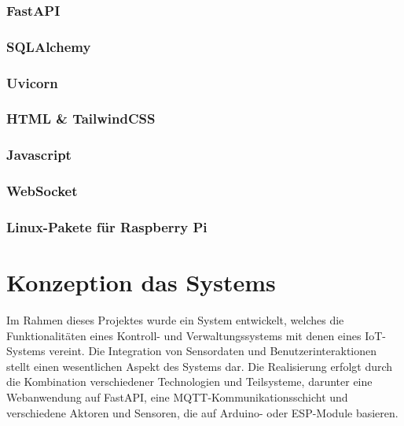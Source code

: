 \documentclass[12pt, letterpaper]{article}
\begin{document}
    \subsubsection{FastAPI}
    \subsubsection{SQLAlchemy}
    \subsubsection{Uvicorn}
    \subsubsection{HTML \& TailwindCSS}
    \subsubsection{Javascript}
    \subsubsection{WebSocket}
    \subsubsection{Linux-Pakete für Raspberry Pi}

\newpage
\section{Konzeption das Systems}
\par Im Rahmen dieses Projektes wurde ein System entwickelt, welches die Funktionalitäten eines Kontroll- und Verwaltungssystems mit denen eines IoT-Systems vereint. Die Integration von Sensordaten und Benutzerinteraktionen stellt einen wesentlichen Aspekt des Systems dar. Die Realisierung erfolgt durch die Kombination verschiedener Technologien und Teilsysteme, darunter eine Webanwendung auf FastAPI, eine MQTT-Kommunikationsschicht und verschiedene Aktoren und Sensoren, die auf Arduino- oder ESP-Module basieren.
\end{document}
